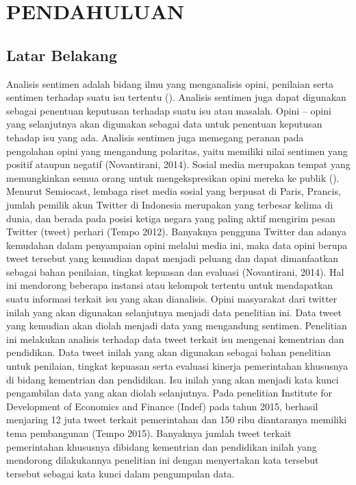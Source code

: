 \section*{PENDAHULUAN} %
\subsection*{Latar Belakang}
Analisis sentimen adalah bidang ilmu yang menganalisis opini, penilaian serta sentimen terhadap suatu isu tertentu \citeauthor{LIU2012} (\cite*{LIU2012}). Analisis sentimen juga dapat digunakan sebagai penentuan keputusan terhadap suatu isu atau masalah. Opini – opini yang selanjutnya akan digunakan sebagai data untuk penentuan keputusan tehadap isu yang ada. Analisis sentimen juga memegang peranan pada pengolahan opini yang mengandung polaritas, yaitu memiliki nilai sentimen yang positif ataupun negatif (Novantirani, 2014). Sosial media merupakan tempat yang memungkinkan semua orang untuk mengekspresikan opini mereka ke publik \citeauthor{LIU2012} (\cite*{LIU2012}). Menurut Semiocast, lembaga riset media sosial yang berpusat di Paris, Prancis, jumlah pemilik akun Twitter di Indonesia merupakan yang terbesar kelima di dunia, dan berada pada posisi ketiga negara yang paling aktif mengirim pesan Twitter (tweet) perhari (Tempo 2012). Banyaknya pengguna Twitter dan adanya kemudahan dalam penyampaian opini melalui media ini, maka data opini berupa tweet tersebut yang kemudian dapat menjadi peluang dan dapat dimanfaatkan sebagai bahan penilaian, tingkat kepuasan dan evaluasi (Novantirani, 2014). Hal ini mendorong beberapa instansi atau kelompok tertentu untuk mendapatkan suatu informasi terkait isu yang akan dianalisis. \newline
Opini masyarakat dari twitter inilah yang akan digunakan selanjutnya menjadi data penelitian ini. Data tweet yang kemudian akan diolah menjadi data yang mengandung sentimen. Penelitian ini melakukan analisis terhadap data tweet terkait isu mengenai kementrian dan pendidikan. Data tweet inilah yang akan digunakan sebagai bahan penelitian untuk penilaian, tingkat kepuasan serta evaluasi kinerja pemerintahan khususnya di bidang kementrian dan pendidikan. Isu inilah yang akan menjadi kata kunci pengambilan data yang akan diolah selanjutnya. Pada penelitian Institute for Development of Economics and Finance (Indef) pada tahun 2015, berhasil menjaring 12 juta tweet terkait pemerintahan dan 150 ribu diantaranya memiliki tema pembangunan (Tempo 2015). Banyaknya jumlah tweet terkait pemerintahan khususnya dibidang kementrian dan pendidikan inilah yang mendorong dilakukannya penelitian ini dengan menyertakan kata tersebut tersebut sebagai kata kunci dalam pengumpulan data. \newline
